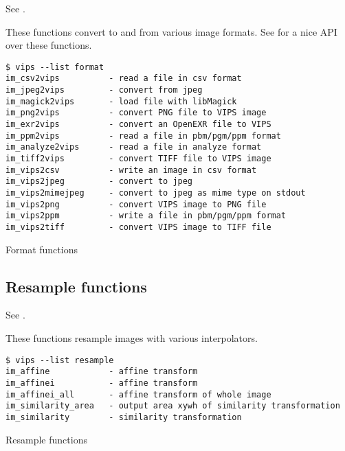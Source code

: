 See .

These functions convert to and from various image formats. See
 for a nice API over these functions.

\begin{fig2}
\begin{verbatim}
$ vips --list format
im_csv2vips          - read a file in csv format
im_jpeg2vips         - convert from jpeg
im_magick2vips       - load file with libMagick
im_png2vips          - convert PNG file to VIPS image
im_exr2vips          - convert an OpenEXR file to VIPS
im_ppm2vips          - read a file in pbm/pgm/ppm format
im_analyze2vips      - read a file in analyze format
im_tiff2vips         - convert TIFF file to VIPS image
im_vips2csv          - write an image in csv format
im_vips2jpeg         - convert to jpeg
im_vips2mimejpeg     - convert to jpeg as mime type on stdout
im_vips2png          - convert VIPS image to PNG file
im_vips2ppm          - write a file in pbm/pgm/ppm format
im_vips2tiff         - convert VIPS image to TIFF file
\end{verbatim}
\caption{Format functions}
\label{fg:format}
\end{fig2}

\subsection{Resample functions}

See .

These functions resample images with various interpolators.

\begin{fig2}
\begin{verbatim}
$ vips --list resample
im_affine            - affine transform
im_affinei           - affine transform
im_affinei_all       - affine transform of whole image
im_similarity_area   - output area xywh of similarity transformation
im_similarity        - similarity transformation
\end{verbatim}
\caption{Resample functions}
\label{fg:resample}
\end{fig2}
